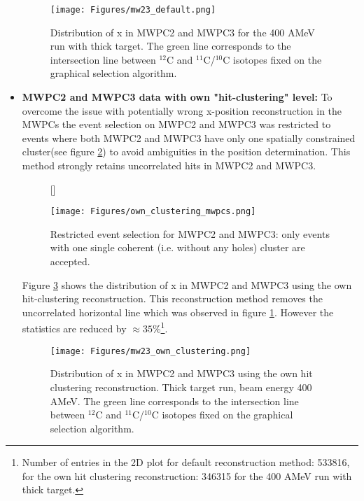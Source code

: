 \begin{itemize}
\begin{figure}[htpb]
    \centering
    \texttt{[image: Figures/mw23\_default.png]}
    \caption{
   	 Distribution of x in MWPC2 and MWPC3 for the 400 AMeV run with thick target. The green line corresponds to the intersection line between $^{12}$C and $^{11}$C/$^{10}$C isotopes fixed on the graphical selection algorithm.
     }
    \label{fig:x_mw23_default}
\end{figure}
\item \textbf{MWPC2 and MWPC3 data with own "hit-clustering" level:}\newline 
To overcome the issue with potentially wrong x-position reconstruction in the MWPCs the event selection on MWPC2 and MWPC3 was restricted to events where both MWPC2 and MWPC3 have only one spatially constrained cluster(see figure \ref{fig:own_clustering}) to avoid ambiguities in the position determination. This method strongly retains uncorrelated hits in MWPC2 and MWPC3.\newline
\begin{figure}
[\FBwidth]
{\caption{Restricted event selection for MWPC2 and MWPC3: only events with one single coherent (i.e. without any holes) cluster are accepted.}\label{fig:own_clustering}}
{\texttt{[image: Figures/own\_clustering\_mwpcs.png]}}
\end{figure}
Figure \ref{fig:mw23_own_clustering} shows the distribution of x in MWPC2 and MWPC3 using the own hit-clustering reconstruction. This reconstruction method removes the uncorrelated horizontal line which was observed in figure \ref{fig:x_mw23_default}. However the statistics are reduced by $\approx 35\%$\footnote{Number of entries in the 2D plot for default reconstruction method: 533816, for the own hit clustering reconstruction: 346315 for the 400 AMeV run with thick target.}.
\begin{figure}[htpb]
    \centering
    \texttt{[image: Figures/mw23\_own\_clustering.png]}
    \caption{
   	 Distribution of x in MWPC2 and MWPC3 using the own hit clustering reconstruction. Thick target run, beam energy 400 AMeV. The green line corresponds to the intersection line between $^{12}$C and $^{11}$C/$^{10}$C isotopes fixed on the graphical selection algorithm.
     }
    \label{fig:mw23_own_clustering}
\end{figure}


\end{itemize}
